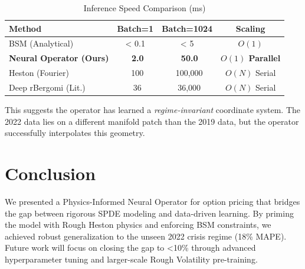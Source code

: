 \documentclass{article}
\begin{document}
\begin{table}[h]
    \centering
    \caption{Inference Speed Comparison (ms)}
    \label{tab:benchmark}
    \begin{tabular}{lccc}
        \toprule
        \textbf{Method} & \textbf{Batch=1} & \textbf{Batch=1024} & \textbf{Scaling} \\
        \midrule
        BSM (Analytical) & < 0.1 & < 5 & \(O(1)\) \\
        \textbf{Neural Operator (Ours)} & \textbf{~2.0} & \textbf{~50.0} & \textbf{\(O(1)\) Parallel} \\
        Heston (Fourier) & ~100 & ~100,000 & \(O(N)\) Serial \\
        Deep rBergomi (Lit.) & ~36 & ~36,000 & \(O(N)\) Serial \\
        \bottomrule
    \end{tabular}
\end{table}

This suggests the operator has learned a \emph{regime-invariant} coordinate system. The 2022 data lies on a different manifold patch than the 2019 data, but the operator successfully interpolates this geometry.

\section{Conclusion}
We presented a Physics-Informed Neural Operator for option pricing that bridges the gap between rigorous SPDE modeling and data-driven learning. By priming the model with Rough Heston physics and enforcing BSM constraints, we achieved robust generalization to the unseen 2022 crisis regime (18\% MAPE). Future work will focus on closing the gap to <10\% through advanced hyperparameter tuning and larger-scale Rough Volatility pre-training.



\end{document}
